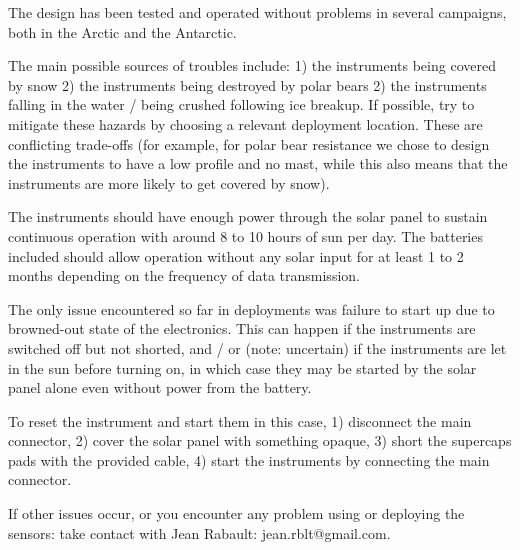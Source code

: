 \documentclass[pdftex,a4paper,12pt,twocolumn,fleqn,captions=tableheading]{scrartcl}
\begin{document}
The design has been tested and operated without problems in several campaigns, both in the Arctic and the Antarctic.

The main possible sources of troubles include: 1) the instruments being covered by snow 2) the instruments being destroyed by polar bears 2) the instruments falling in the water / being crushed following ice breakup. If possible, try to mitigate these hazards by choosing a relevant deployment location. These are conflicting trade-offs (for example, for polar bear resistance we chose to design the instruments to have a low profile and no mast, while this also means that the instruments are more likely to get covered by snow).

The instruments should have enough power through the solar panel to sustain continuous operation with around 8 to 10 hours of sun per day. The batteries included should allow operation without any solar input for at least 1 to 2 months depending on the frequency of data transmission.

The only issue encountered so far in deployments was failure to start up due to browned-out state of the electronics. This can happen if the instruments are switched off but not shorted, and / or (note: uncertain) if the instruments are let in the sun before turning on, in which case they may be started by the solar panel alone even without power from the battery.

To reset the instrument and start them in this case, 1) disconnect the main connector, 2) cover the solar panel with something opaque, 3) short the supercaps pads with the provided cable, 4) start the instruments by connecting the main connector.

If other issues occur, or you encounter any problem using or deploying the sensors: take contact with Jean Rabault: jean.rblt@gmail.com.
\end{document}
